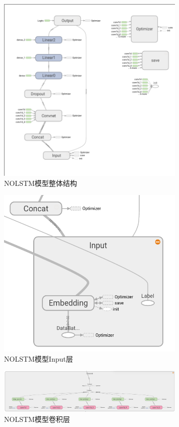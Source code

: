 \begin{figure}[!hbp]
\begin{center}
\includegraphics[width=0.8\textwidth]{graphic/nolstm1.png}
\caption{NOLSTM模型整体结构 \label{nolstm1}}
\end{center}
\end{figure}
\begin{figure}[!hbp]
\begin{center}
\includegraphics[width=0.8\textwidth]{graphic/nolstm2.png}
\caption{NOLSTM模型Input层 \label{nolstm2}}
\end{center}
\end{figure}
\begin{figure}[!hbp]
\begin{center}
\includegraphics[width=0.8\textwidth]{graphic/nolstm3.png}
\caption{NOLSTM模型卷积层 \label{nolstm3}}
\end{center}
\end{figure}
